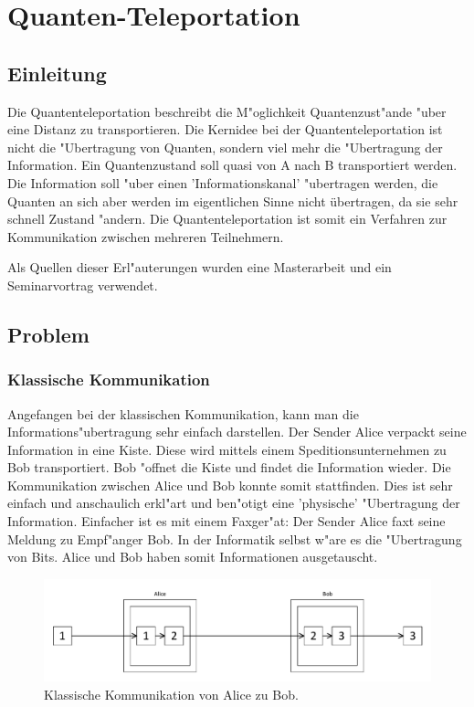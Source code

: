 \chapter{Quanten-Teleportation\label{chapter:teleport}}
\begin{refsection}

\section{Einleitung}

Die Quantenteleportation beschreibt die M"oglichkeit Quantenzust"ande "uber eine Distanz zu transportieren. Die Kernidee bei der Quantenteleportation ist nicht die "Ubertragung von Quanten, sondern viel mehr die "Ubertragung der Information. Ein Quantenzustand soll quasi von A nach B transportiert werden. Die Information soll "uber einen 'Informationskanal' "ubertragen werden, die Quanten an sich aber werden im eigentlichen Sinne nicht übertragen, da sie sehr schnell Zustand "andern. Die Quantenteleportation ist somit ein Verfahren zur Kommunikation zwischen mehreren Teilnehmern.

Als Quellen dieser Erl"auterungen wurden eine Masterarbeit \cite{teleport:mscthesis} und ein Seminarvortrag \cite{teleport:teleport-seminar} verwendet.

\section{Problem}
\subsection{Klassische Kommunikation}
Angefangen bei der klassischen Kommunikation, kann man die Informations"ubertragung sehr einfach darstellen. Der Sender Alice verpackt seine Information in eine Kiste. Diese wird mittels einem Speditionsunternehmen zu Bob transportiert. Bob "offnet die Kiste und findet die Information wieder. Die Kommunikation zwischen Alice und Bob konnte somit stattfinden. Dies ist sehr einfach und anschaulich erkl"art und ben"otigt eine 'physische' "Ubertragung der Information. Einfacher ist es mit einem Faxger"at: Der Sender Alice faxt seine Meldung zu Empf"anger Bob. In der Informatik selbst w"are es die "Ubertragung von Bits. Alice und Bob haben somit Informationen ausgetauscht.
\begin{figure}
\center
\includegraphics[width=1\textwidth]{teleport/image/classic_com.pdf}
\caption{Klassische Kommunikation von Alice zu Bob.}
\label{Klassische Kommunikation}
\end{figure}

\end{refsection}

